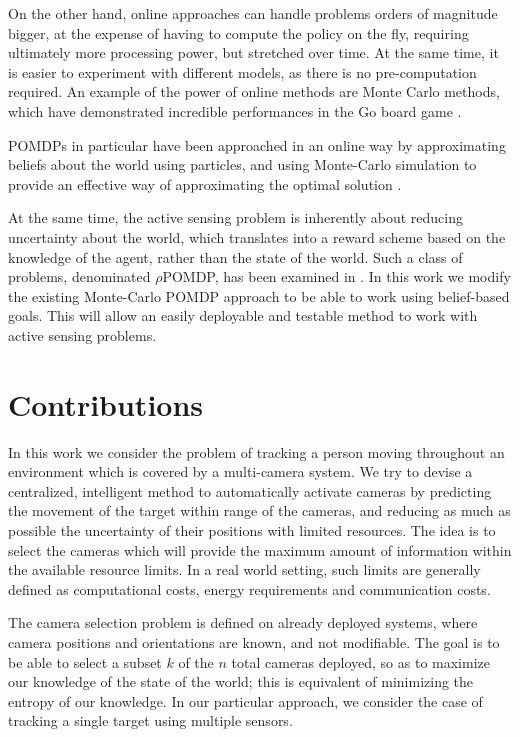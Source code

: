 On the other hand, online approaches can handle problems orders of magnitude bigger, at the expense
of having to compute the policy on the fly, requiring ultimately more processing power, but stretched
over time. At the same time, it is easier to experiment with different models, as there is no
pre-computation required. An example of the power of online methods are Monte Carlo methods, which
have demonstrated incredible performances in the Go board game \cite{cit:mcts}.

POMDPs in particular have been approached in an online way by approximating beliefs about the world
using particles, and using Monte-Carlo simulation to provide an effective way of approximating the
optimal solution \cite{cit:pomcp}.

At the same time, the active sensing problem is inherently about reducing uncertainty about the
world, which translates into a reward scheme based on the knowledge of the agent, rather than the
state of the world. Such a class of problems, denominated $\rho$POMDP, has been examined in
\cite{cit:rpomdp}. In this work we modify the existing Monte-Carlo POMDP approach to be able to work
using belief-based goals. This will allow an easily deployable and testable method to work with
active sensing problems.


\section{Contributions}

In this work we consider the problem of tracking a person moving throughout an environment which is
covered by a multi-camera system. We try to devise a centralized, intelligent method to
automatically activate cameras by predicting the movement of the target within range of the cameras,
and reducing as much as possible the uncertainty of their positions with limited resources. The idea
is to select the cameras which will provide the maximum amount of information within the available
resource limits. In a real world setting, such limits are generally defined as computational costs,
energy requirements and communication costs.

The camera selection problem is defined on already deployed systems, where camera positions and
orientations are known, and not modifiable. The goal is to be able to select a subset $k$ of the $n$
total cameras deployed, so as to maximize our knowledge of the state of the world; this is
equivalent of minimizing the entropy of our knowledge. In our particular approach, we consider the
case of tracking a single target using multiple sensors.

